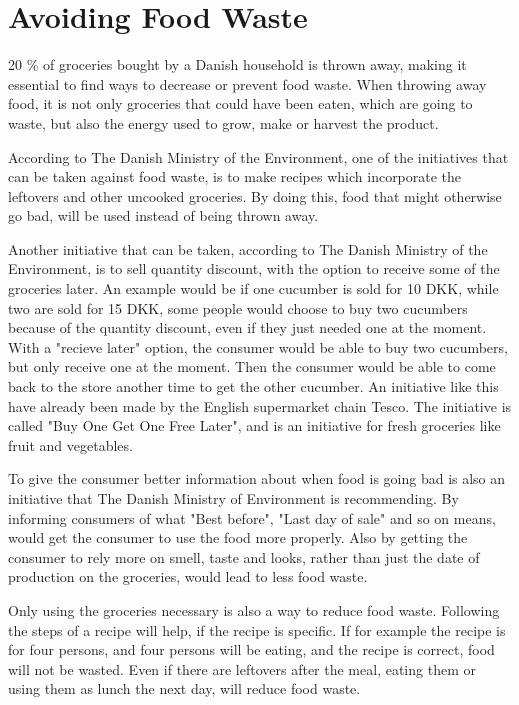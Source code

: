 \section{Avoiding Food Waste} \label{HowToAvoidFoodWaste}
20 \% of groceries bought by a Danish household is thrown away, making it essential to find ways to decrease or prevent food waste. When throwing away food, it is not only groceries that could have been eaten, which are going to waste, but also the energy used to grow, make or harvest the product.

According to The Danish Ministry of the Environment\cite{madSpild_Notat}, one of the initiatives that can be taken against food waste, is to make recipes which incorporate the leftovers and other uncooked groceries. By doing this, food that might otherwise go bad, will be used instead of being thrown away.

Another initiative that can be taken, according to The Danish Ministry of the Environment, is to sell quantity discount, with the option to receive some of the groceries later. An example would be if one cucumber is sold for 10 DKK, while two are sold for 15 DKK, some people would choose to buy two cucumbers because of the quantity discount, even if they just needed one at the moment. With a "recieve later" option, the consumer would be able to buy two cucumbers, but only receive one at the moment. Then the consumer would be able to come back to the store another time to get the other cucumber. An initiative like this have already been made by the English supermarket chain Tesco. The initiative is called "Buy One Get One Free Later", and is an initiative for fresh groceries like fruit and vegetables.

To give the consumer better information about when food is going bad is also an initiative that The Danish Ministry of Environment is recommending. By informing consumers of what "Best before", "Last day of sale" and so on means, would get the consumer to use the food more properly. Also by getting the consumer to rely more on smell, taste and looks, rather than just the date of production on the groceries, would lead to less food waste.

Only using the groceries necessary is also a way to reduce food waste. Following the steps of a recipe will help, if the recipe is specific. If for example the recipe is for four persons, and four persons will be eating, and the recipe is correct, food will not be wasted. Even if there are leftovers after the meal, eating them or using them as lunch the next day, will reduce food waste\cite{madSpild_MindreMadspild}.

